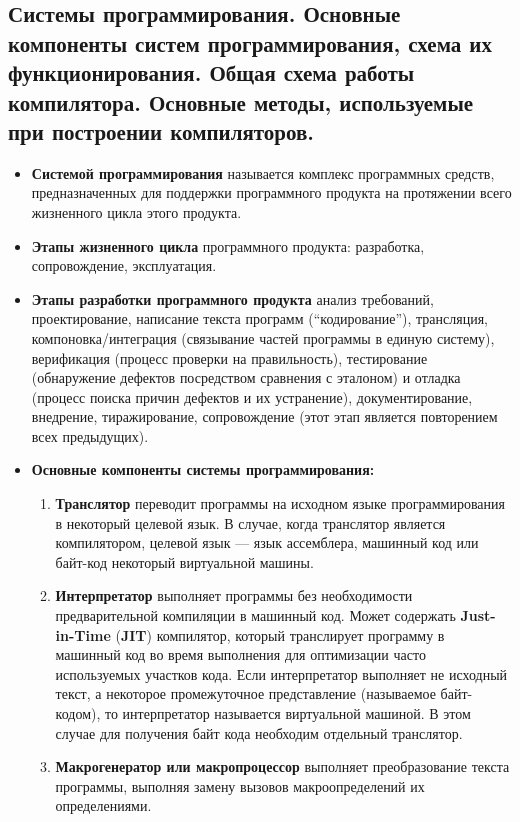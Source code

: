 \subsection{Системы программирования. Основные компоненты систем программирования, схема их функционирования. Общая схема работы компилятора. Основные методы, используемые при построении компиляторов.}

\begin{itemize}
    \item \textbf{Системой программирования} называется комплекс программных средств, предназначенных для поддержки программного продукта на протяжении всего жизненного цикла этого продукта.
    \item \textbf{Этапы жизненного цикла} программного продукта: разработка, сопровождение, эксплуатация.
    \item \textbf{Этапы разработки программного продукта}
        анализ требований,
        проектирование,
        написание текста программ (``кодирование''),
        трансляция, компоновка/интеграция (связывание частей программы в единую систему),
        верификация (процесс проверки на правильность), тестирование (обнаружение дефектов посредством сравнения с эталоном) и отладка (процесс поиска причин дефектов и их устранение),
        документирование,
        внедрение,
        тиражирование,
        сопровождение (этот этап является повторением всех предыдущих).
    \item \textbf{Основные компоненты системы программирования:}
    \begin{enumerate}
        \item \textbf{Транслятор} переводит программы на исходном языке программирования в некоторый целевой язык.
        В случае, когда транслятор является компилятором, целевой язык --- язык ассемблера, машинный код или байт-код некоторый виртуальной машины.
        \item \textbf{Интерпретатор} выполняет программы без необходимости предварительной компиляции в машинный код.
        Может содержать \textbf{Just-in-Time} (\textbf{JIT}) компилятор, который транслирует программу в машинный код во время выполнения для оптимизации часто используемых участков кода.
        Если интерпретатор выполняет не исходный текст, а некоторое промежуточное представление (называемое байт-кодом), то интерпретатор называется виртуальной машиной.
        В этом случае для получения байт кода необходим отдельный транслятор.
        \item \textbf{Макрогенератор или макропроцессор} выполняет преобразование текста программы, выполняя замену вызовов макроопределений их определениями.

\end{enumerate}
\end{itemize}
